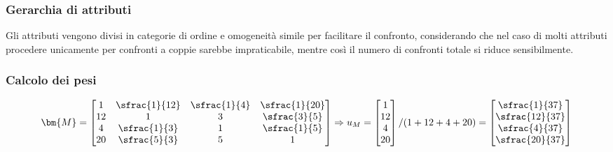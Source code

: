 \documentclass[\main/main.tex]{subfiles}
\begin{document}
\subsubsection*{Gerarchia di attributi}
Gli attributi vengono divisi in categorie di ordine e omogeneità simile per facilitare il confronto, considerando che nel caso di molti attributi procedere unicamente per confronti a coppie sarebbe impraticabile, mentre così il numero di confronti totale si riduce sensibilmente.

\subsubsection*{Calcolo dei pesi}
\[
  \bm{M} = \begin{bmatrix}
    1  & \sfrac{1}{12} & \sfrac{1}{4} & \sfrac{1}{20} \\
    12 & 1             & 3            & \sfrac{3}{5}  \\
    4  & \sfrac{1}{3}  & 1            & \sfrac{1}{5}  \\
    20 & \sfrac{5}{3}  & 5            & 1
  \end{bmatrix}
  \Rightarrow
  u_M = \begin{bmatrix}
    1  \\
    12 \\
    4  \\
    20 \\
  \end{bmatrix}/(1+12+4+20)
  = \begin{bmatrix}
    \sfrac{1 }{37} \\
    \sfrac{12}{37} \\
    \sfrac{4 }{37} \\
    \sfrac{20}{37} \\
  \end{bmatrix}
\]
\end{document}
